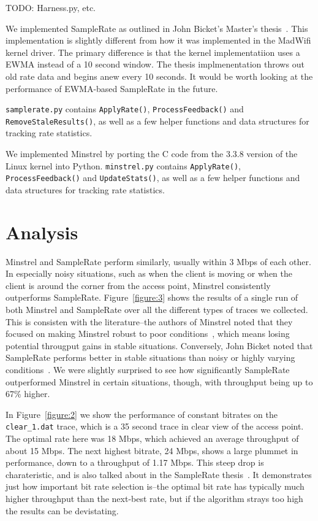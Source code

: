 \documentclass[letterpaper,twocolumn,10pt]{article}
\begin{document}
TODO: Harness.py, etc.

We implemented SampleRate as outlined in John Bicket's Master's thesis~\cite{samplerate}. This implementation is slightly different from how it was implemented in the MadWifi kernel driver. The primary difference is that the kernel implementatiion uses a EWMA instead of a 10 second window. The thesis implmenentation throws out old rate data and begins anew every 10 seconds. It would be worth looking at the performance of EWMA-based SampleRate in the future. 

\texttt{samplerate.py} contains \texttt{ApplyRate()}, \texttt{ProcessFeedback()} and  \texttt{RemoveStaleResults()}, as well as a few helper functions and data structures for tracking rate statistics. 

We implemented Minstrel by porting the C code from the 3.3.8 version of the Linux kernel into Python. \texttt{minstrel.py} contains \texttt{ApplyRate()}, \texttt{ProcessFeedback()} and  \texttt{UpdateStats()}, as well as a few helper functions and data structures for tracking rate statistics. 


\section{Analysis}

Minstrel and SampleRate perform similarly, usually within 3 Mbps of each other. In especially noisy situations, such as when the client is moving or when the client is around the corner from the access point, Minstrel consistently outperforms SampleRate. Figure~\ref{figure:3} shows the results of a single run of both Minstrel and SampleRate over all the different types of traces we collected. This is consisten with the literature--the authors of Minstrel noted that they focused on making Minstrel robust to poor conditions~\cite{minstrel}, which means losing potential througput gains in stable situations. Conversely, John Bicket noted that SampleRate performs better in stable situations than noisy or highly varying conditions~\cite{samplerate}. We were slightly surprised to see how significantly SampleRate outperformed Minstrel in certain situations, though, with throughput being up to 67\% higher. 

In Figure~\ref{figure:2} we show the performance of constant bitrates on the \texttt{clear\_1.dat} trace, which is a 35 second trace in clear view of the access point. The optimal rate here was 18 Mbps, which achieved an average throughput of about 15 Mbps. The next highest bitrate, 24 Mbps, shows a large plummet in performance, down to a throughput of 1.17 Mbps. This steep drop is charateristic, and is also talked about in the SampleRate thesis~\cite{samplerate}. It demonstrates just how important bit rate selection is--the optimal bit rate has typically much higher throughput than the next-best rate, but if the algorithm strays too high the results can be devistating. 
\end{document}
